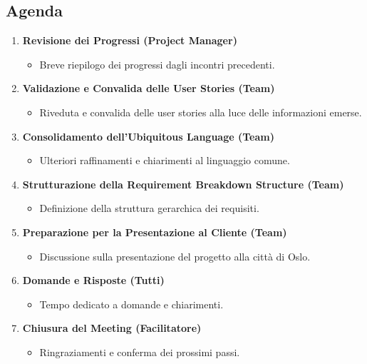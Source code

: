 \subsection{Agenda}

\begin{enumerate}
    \item \textbf{Revisione dei Progressi (Project Manager)}
    \begin{itemize}
        \item Breve riepilogo dei progressi dagli incontri precedenti.
    \end{itemize}
    
    \item \textbf{Validazione e Convalida delle User Stories (Team)}
    \begin{itemize}
        \item Riveduta e convalida delle user stories alla luce delle informazioni emerse.
    \end{itemize}
    
    \item \textbf{Consolidamento dell'Ubiquitous Language (Team)}
    \begin{itemize}
        \item Ulteriori raffinamenti e chiarimenti al linguaggio comune.
    \end{itemize}
    
    \item \textbf{Strutturazione della Requirement Breakdown Structure (Team)}
    \begin{itemize}
        \item Definizione della struttura gerarchica dei requisiti.
    \end{itemize}
    
    \item \textbf{Preparazione per la Presentazione al Cliente (Team)}
    \begin{itemize}
        \item Discussione sulla presentazione del progetto alla città di Oslo.
    \end{itemize}
    
    \item \textbf{Domande e Risposte (Tutti)}
    \begin{itemize}
        \item Tempo dedicato a domande e chiarimenti.
    \end{itemize}
    
    \item \textbf{Chiusura del Meeting (Facilitatore)}
    \begin{itemize}
        \item Ringraziamenti e conferma dei prossimi passi.
    \end{itemize}
\end{enumerate}

